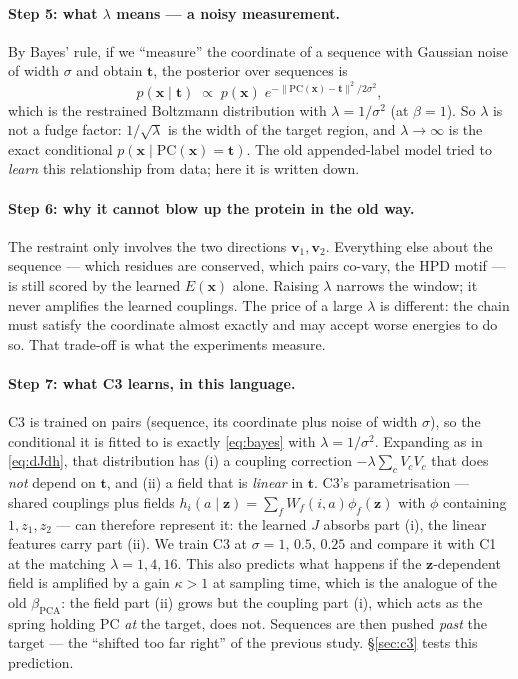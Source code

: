 \documentclass[10pt,a4paper]{article}
\newcommand{\PC}{\mathrm{PC}}
\begin{document}
\paragraph{Step 5: what $\lambda$ means --- a noisy measurement.} By Bayes' rule, if we ``measure''
the coordinate of a sequence with Gaussian noise of width $\sigma$ and obtain $\bm t$, the posterior
over sequences is
\begin{equation}
p(\bm x\mid\bm t)\;\propto\;p(\bm x)\;e^{-\|\PC(\bm x)-\bm t\|^2/2\sigma^2} ,
\label{eq:bayes}
\end{equation}
which is the restrained Boltzmann distribution with $\lambda=1/\sigma^2$ (at $\beta=1$). So
$\lambda$ is not a fudge factor: $1/\sqrt\lambda$ is the width of the target region, and
$\lambda\to\infty$ is the exact conditional $p(\bm x\mid\PC(\bm x)=\bm t)$. The old appended-label
model tried to \emph{learn} this relationship from data; here it is written down.

\paragraph{Step 6: why it cannot blow up the protein in the old way.} The restraint only involves
the two directions $\bm v_1,\bm v_2$. Everything else about the sequence --- which residues are
conserved, which pairs co-vary, the HPD motif --- is still scored by the learned $E(\bm x)$ alone.
Raising $\lambda$ narrows the window; it never amplifies the learned couplings. The price of a
large $\lambda$ is different: the chain must satisfy the coordinate almost exactly and may accept
worse energies to do so. That trade-off is what the experiments measure.

\paragraph{Step 7: what C3 learns, in this language.} C3 is trained on pairs (sequence, its
coordinate plus noise of width $\sigma$), so the conditional it is fitted to is exactly
\eqref{eq:bayes} with $\lambda=1/\sigma^2$. Expanding as in \eqref{eq:dJdh}, that distribution has
(i) a coupling correction $-\lambda\sum_cV_cV_c$ that does \emph{not} depend on $\bm t$, and (ii) a
field that is \emph{linear} in $\bm t$. C3's parametrisation --- shared couplings plus fields
$h_i(a\mid\bm z)=\sum_f W_f(i,a)\phi_f(\bm z)$ with $\phi$ containing $1,z_1,z_2$ --- can therefore
represent it: the learned $J$ absorbs part (i), the linear features carry part (ii). We train C3 at
$\sigma=1,\,0.5,\,0.25$ and compare it with C1 at the matching $\lambda=1,4,16$. This also predicts
what happens if the $\bm z$-dependent field is amplified by a gain $\kappa>1$ at sampling time,
which is the analogue of the old $\beta_\mathrm{PCA}$: the field part (ii) grows but the
coupling part (i), which acts as the spring holding $\PC$ \emph{at} the target, does not.
Sequences are then pushed \emph{past} the target --- the ``shifted too far right'' of the previous
study. \S\ref{sec:c3} tests this prediction.


\end{document}

